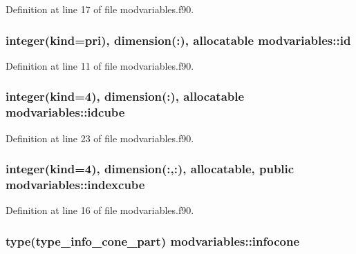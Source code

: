 Definition at line 17 of file modvariables.\-f90.

\hypertarget{classmodvariables_ac2069a0665c46610db9e57a5d5eaf195}{
\subsubsection[{id}]{\setlength{\rightskip}{0pt plus 5cm}integer(kind=pri), dimension(\-:), allocatable modvariables\-::id}}\label{classmodvariables_ac2069a0665c46610db9e57a5d5eaf195}


Definition at line 11 of file modvariables.\-f90.

\hypertarget{classmodvariables_a22925cb23ea4a80a06b3f4b67b62102e}{
\subsubsection[{idcube}]{\setlength{\rightskip}{0pt plus 5cm}integer(kind=4), dimension(\-:), allocatable modvariables\-::idcube}}\label{classmodvariables_a22925cb23ea4a80a06b3f4b67b62102e}


Definition at line 23 of file modvariables.\-f90.

\hypertarget{classmodvariables_a71f7a5aeca39e755788217f3b8093f9a}{
\subsubsection[{indexcube}]{\setlength{\rightskip}{0pt plus 5cm}integer(kind=4), dimension(\-:,\-:), allocatable, public modvariables\-::indexcube}}\label{classmodvariables_a71f7a5aeca39e755788217f3b8093f9a}


Definition at line 16 of file modvariables.\-f90.

\hypertarget{classmodvariables_ad22024085a623d456c41ca16222120a6}{
\subsubsection[{infocone}]{\setlength{\rightskip}{0pt plus 5cm}type(type\-\_\-info\-\_\-cone\-\_\-part) modvariables\-::infocone}}\label{classmodvariables_ad22024085a623d456c41ca16222120a6}


